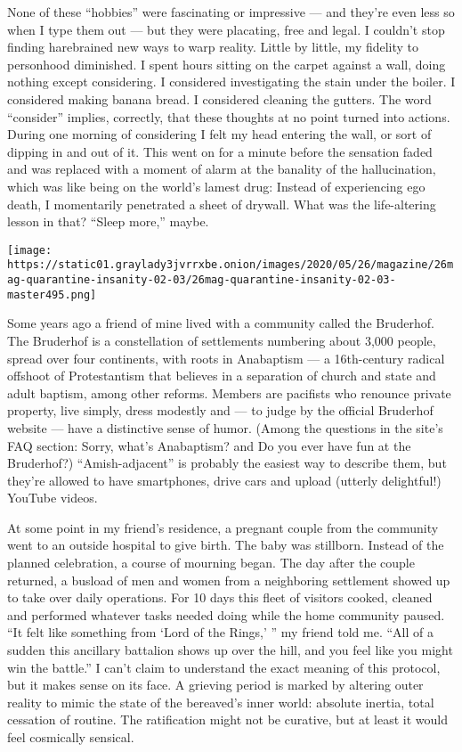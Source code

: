 None of these ``hobbies'' were fascinating or impressive --- and they're
even less so when I type them out --- but they were placating, free and
legal. I couldn't stop finding harebrained new ways to warp reality.
Little by little, my fidelity to personhood diminished. I spent hours
sitting on the carpet against a wall, doing nothing except considering.
I considered investigating the stain under the boiler. I considered
making banana bread. I considered cleaning the gutters. The word
``consider'' implies, correctly, that these thoughts at no point turned
into actions. During one morning of considering I felt my head entering
the wall, or sort of dipping in and out of it. This went on for a minute
before the sensation faded and was replaced with a moment of alarm at
the banality of the hallucination, which was like being on the world's
lamest drug: Instead of experiencing ego death, I momentarily penetrated
a sheet of drywall. What was the life-altering lesson in that? ``Sleep
more,'' maybe.

\texttt{[image: https://static01.graylady3jvrrxbe.onion/images/2020/05/26/magazine/26mag-quarantine-insanity-02-03/26mag-quarantine-insanity-02-03-master495.png]}

Some years ago a friend of mine lived with a community called the
Bruderhof. The Bruderhof is a constellation of settlements numbering
about 3,000 people, spread over four continents, with roots in
Anabaptism --- a 16th-century radical offshoot of Protestantism that
believes in a separation of church and state and adult baptism, among
other reforms. Members are pacifists who renounce private property, live
simply, dress modestly and --- to judge by the official Bruderhof
website --- have a distinctive sense of humor. (Among the questions in
the site's FAQ section: Sorry, what's Anabaptism? and Do you ever have
fun at the Bruderhof?) ``Amish-adjacent'' is probably the easiest way to
describe them, but they're allowed to have smartphones, drive cars and
upload (utterly delightful!) YouTube videos.

At some point in my friend's residence, a pregnant couple from the
community went to an outside hospital to give birth. The baby was
stillborn. Instead of the planned celebration, a course of mourning
began. The day after the couple returned, a busload of men and women
from a neighboring settlement showed up to take over daily operations.
For 10 days this fleet of visitors cooked, cleaned and performed
whatever tasks needed doing while the home community paused. ``It felt
like something from `Lord of the Rings,' '' my friend told me. ``All of
a sudden this ancillary battalion shows up over the hill, and you feel
like you might win the battle.'' I can't claim to understand the exact
meaning of this protocol, but it makes sense on its face. A grieving
period is marked by altering outer reality to mimic the state of the
bereaved's inner world: absolute inertia, total cessation of routine.
The ratification might not be curative, but at least it would feel
cosmically sensical.

